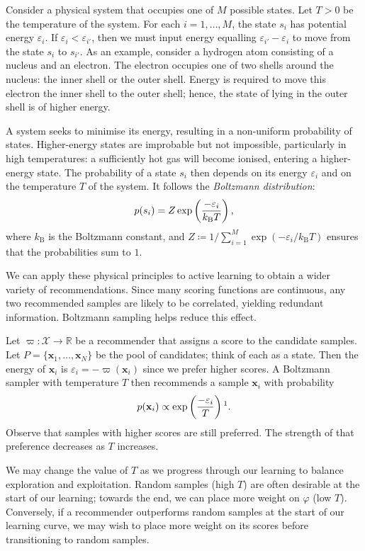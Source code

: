 \documentclass[11pt,twoside,openright]{report}
\newcommand\bbR{\mathbb{R}}
\newcommand\bx{\mathbf{x}}
\newcommand\cX{\mathcal{X}}
\begin{document}
Consider a physical system that occupies one of $M$ possible states. Let $T > 0$ be the temperature of the system. For each $i=1, \dots, M$, the state $s_i$ has potential energy $\varepsilon_i$. If $\varepsilon_i < \varepsilon_{i'}$, then we must input energy equalling $\varepsilon_{i'} - \varepsilon_i$ to move from the state $s_i$ to $s_{i'}$. As an example, consider a hydrogen atom consisting of a nucleus and an electron. The electron occupies one of two shells around the nucleus: the inner shell or the outer shell. Energy is required to move this electron the inner shell to the outer shell; hence, the state of lying in the outer shell is of higher energy.

A system seeks to minimise its energy, resulting in a non-uniform probability of states. Higher-energy states are improbable but not impossible, particularly in high temperatures: a sufficiently hot gas will become ionised, entering a higher-energy state. The probability of a state $s_i$ then depends on its energy $\varepsilon_i$ and on the temperature $T$ of the system. It follows the \textit{Boltzmann distribution}:\[
  p(s_i) = Z\exp\left(\frac{-\varepsilon_i}{k_\mathrm{B}T}\right) \text,
\] where $k_\mathrm{B}$ is the Boltzmann constant, and $Z \coloneqq 1/\sum^{M}_{i=1}\exp(-\varepsilon_i/k_\mathrm{B}T)$ ensures that the probabilities sum to $1$. \citep{Schroeder}

We can apply these physical principles to active learning to obtain a wider variety of recommendations. Since many scoring functions are continuous, any two recommended samples are likely to be correlated, yielding redundant information. Boltzmann sampling \citep{Acton} helps reduce this effect.

Let $\varpi : \cX \to \bbR$ be a recommender that assigns a score to the candidate samples. Let $P = \{\bx_1, \dots, \bx_N\}$ be the pool of candidates; think of each as a state. Then the energy of $\bx_i$ is $\varepsilon_i = -\varpi(\bx_i)$ since we prefer higher scores. A Boltzmann sampler with temperature $T$ then recommends a sample $\bx_i$ with probability \[
  p(\bx_i) \propto \exp\left(\frac{-\varepsilon_i}{T}\right) \text{\footnotemark}.
\]Observe that samples with higher scores are still preferred. The strength of that preference decreases as $T$ increases.

We may change the value of $T$ as we progress through our learning to balance exploration and exploitation. Random samples (high $T$) are often desirable at the start of our learning; towards the end, we can place more weight on $\varphi$ (low $T$). Conversely, if a recommender outperforms random samples at the start of our learning curve, we may wish to place more weight on its scores before transitioning to random samples.
\end{document}
